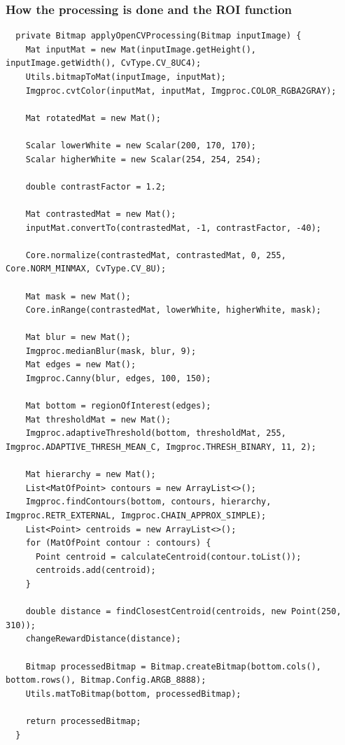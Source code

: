 \documentclass[12pt]{report}
\begin{document}
\subsubsection{How the processing is done and the ROI function}
\label{sub:log2}
\begin{lstlisting}
  private Bitmap applyOpenCVProcessing(Bitmap inputImage) {
    Mat inputMat = new Mat(inputImage.getHeight(), inputImage.getWidth(), CvType.CV_8UC4);
    Utils.bitmapToMat(inputImage, inputMat);
    Imgproc.cvtColor(inputMat, inputMat, Imgproc.COLOR_RGBA2GRAY);

    Mat rotatedMat = new Mat();

    Scalar lowerWhite = new Scalar(200, 170, 170);
    Scalar higherWhite = new Scalar(254, 254, 254);

    double contrastFactor = 1.2; 

    Mat contrastedMat = new Mat();
    inputMat.convertTo(contrastedMat, -1, contrastFactor, -40);

    Core.normalize(contrastedMat, contrastedMat, 0, 255, Core.NORM_MINMAX, CvType.CV_8U);

    Mat mask = new Mat();
    Core.inRange(contrastedMat, lowerWhite, higherWhite, mask);

    Mat blur = new Mat();
    Imgproc.medianBlur(mask, blur, 9);
    Mat edges = new Mat();
    Imgproc.Canny(blur, edges, 100, 150);

    Mat bottom = regionOfInterest(edges);
    Mat thresholdMat = new Mat();
    Imgproc.adaptiveThreshold(bottom, thresholdMat, 255, Imgproc.ADAPTIVE_THRESH_MEAN_C, Imgproc.THRESH_BINARY, 11, 2);

    Mat hierarchy = new Mat(); 
    List<MatOfPoint> contours = new ArrayList<>();
    Imgproc.findContours(bottom, contours, hierarchy, Imgproc.RETR_EXTERNAL, Imgproc.CHAIN_APPROX_SIMPLE);
    List<Point> centroids = new ArrayList<>();
    for (MatOfPoint contour : contours) {
      Point centroid = calculateCentroid(contour.toList());
      centroids.add(centroid);
    }

    double distance = findClosestCentroid(centroids, new Point(250, 310));
    changeRewardDistance(distance);

    Bitmap processedBitmap = Bitmap.createBitmap(bottom.cols(), bottom.rows(), Bitmap.Config.ARGB_8888);
    Utils.matToBitmap(bottom, processedBitmap);

    return processedBitmap;
  }

  
\end{lstlisting}
\end{document}
